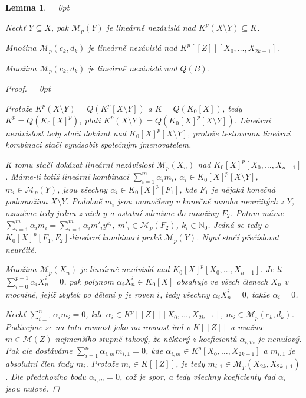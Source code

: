 \documentclass[11pt,a4paper]{article}
\newcommand\m[1]{\mathbb { #1 }} %
\newcommand\p[1]{\mathcal{ #1 }} %
\newcommand\N{\m N}
\newenvironment{items}{%
	\itemize
	\itemsep = 0pt%
}{%
	\enditemize
}
\newcounter{numb}
\theoremstyle{definition}
\theoremstyle{plain}
\newtheorem{lemma}[numb]{Lemma}
\begin{document}
\begin{lemma} \label{thm:lin_indep} \hfill
	\begin{items}
		\item Nechť $Y \subseteq X$, pak $\p M_p(Y)$ je lineárně nezávislá nad $K^p(X \setminus Y) \subseteq K$.
		\item	Množina $\p M_p(c_k, d_k)$ je lineárně nezávislá nad $K^p[[Z]][X_0, \hdots, X_{2k - 1}]$.
		\item Množina $\p M_p(c_k, d_k)$ je lineárně nezávislá nad $Q(B)$. 
	\end{items}
	
	\begin{proof} \hfill
		\begin{items}
			\newcommand*{\I}{_{i = 1}^m}

			\item Protože $K^p(X \setminus Y) = Q(K^p[X \setminus Y])$ a $K = Q(K_0[X])$, tedy $K^p = Q(K_0[X]^p)$, platí $K^p(X \setminus Y) = Q(K_0[X]^p[X \setminus Y])$. Lineární nezávislost tedy stačí dokázat nad $K_0[X]^p[X \setminus Y]$, protože testovanou lineární kombinaci stačí vynásobit společným jmenovatelem.

			K tomu stačí dokázat lineární nezávislost $\p M_p(X_n)$ nad $K_0[X]^p[X_0, \hdots, X_{n - 1}]$. Máme-li totiž lineární kombinaci $\sum\I \alpha_i m_i$, $\alpha_i \in K_0[X]^p[X \setminus Y]$, $m_i \in \p M_p(Y)$, jsou všechny $\alpha_i \in K_0[X]^p[F_1]$, kde $F_1$ je nějaká konečná podmnožina $X \setminus Y$. Podobně $m_i$ jsou monočleny v konečně mnoha neurčitých z $Y$, označme tedy jednu z nich $y$ a ostatní sdružme do množiny $F_2$. Potom máme $\sum\I \alpha_i m_i = \sum\I \alpha_i m'_i y^{k_i}$, $m'_i \in \p M_p(F_2)$, $k_i \in \N_0$. Jedná se tedy o $K_0[X]^p[F_1, F_2]$-lineární kombinaci prvků $\p M_p(Y)$. Nyní stačí přečíslovat neurčité.

			Množina $\p M_p(X_n)$ je lineárně nezávislá nad $K_0[X]^p[X_0, \hdots, X_{n - 1}]$. Je-li $\sum_{i = 0}^{p - 1} \alpha_i X_n^i = 0$, pak polynom $\alpha_i X_n^i \in K_0[X]$ obsahuje ve všech členech $X_n$ v mocnině, jejíž zbytek po dělení $p$ je roven $i$, tedy všechny $\alpha_i X_n^i = 0$, takže $\alpha_i = 0$.

			\item Nechť $\sum_{i = 1}^n \alpha_i m_i = 0$, kde $\alpha_i \in K^p[[Z]][X_0, \hdots, X_{2k - 1}]$, $m_i \in \p M_p(c_k, d_k)$. Podívejme se na tuto rovnost jako na rovnost řad v $K[[Z]]$ a uvažme $m \in \p M(Z)$ nejmenšího stupně takový, že některý z koeficientů $\alpha_{i, m}$ je nenulový. Pak ale dostáváme $\sum_{i = 1}^n \alpha_{i, m} m_{i, 1} = 0$, kde $\alpha_{i, m} \in K^p[X_0, \hdots, X_{2k - 1}]$ a $m_{i, 1}$ je absolutní člen řady $m_i$. Protože $m_i \in K[[Z]]$, je tedy $m_{i, 1} \in \p M_p(X_{2k}, X_{2k + 1})$. Dle předchozího bodu $\alpha_{i, m} = 0$, což je spor, a tedy všechny koeficienty řad $\alpha_i$ jsou nulové.


\end{items}
\end{proof}
\end{lemma}
\end{document}
